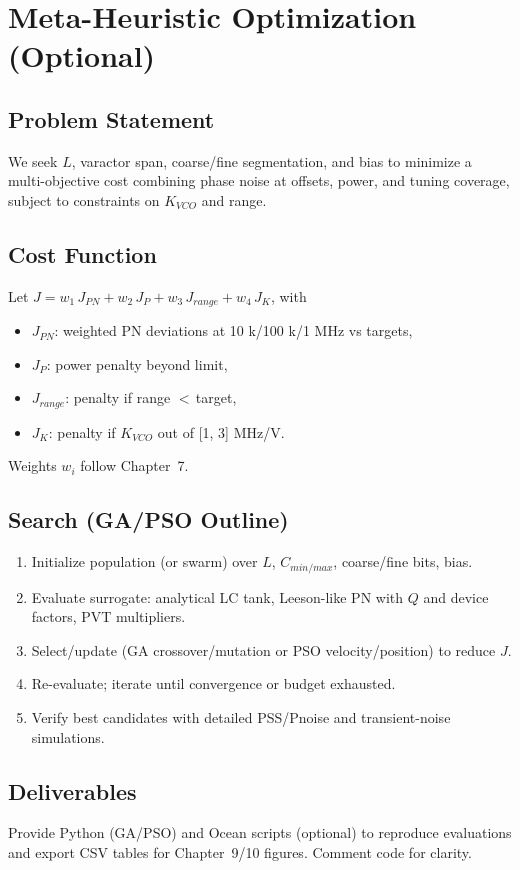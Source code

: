 \chapter{Meta-Heuristic Optimization (Optional)}
\section{Problem Statement}
We seek $L$, varactor span, coarse/fine segmentation, and bias to minimize a multi-objective cost combining phase noise at offsets, power, and tuning coverage, subject to constraints on $K_{VCO}$ and range.

\section{Cost Function}
Let $J = w_1\,J_{PN} + w_2\,J_{P} + w_3\,J_{range} + w_4\,J_{K}$, with
\begin{itemize}
  \item $J_{PN}$: weighted PN deviations at 10 k/100 k/1 MHz vs targets,
  \item $J_P$: power penalty beyond limit,
  \item $J_{range}$: penalty if range $<\,$target,
  \item $J_{K}$: penalty if $K_{VCO}$ out of [1, 3] MHz/V.
\end{itemize}
Weights $w_i$ follow Chapter~7.

\section{Search (GA/PSO Outline)}
\begin{enumerate}
  \item Initialize population (or swarm) over $L$, $C_{min/max}$, coarse/fine bits, bias.
  \item Evaluate surrogate: analytical LC tank, Leeson-like PN with $Q$ and device factors, PVT multipliers.
  \item Select/update (GA crossover/mutation or PSO velocity/position) to reduce $J$.
  \item Re-evaluate; iterate until convergence or budget exhausted.
  \item Verify best candidates with detailed PSS/Pnoise and transient-noise simulations.
\end{enumerate}

\section{Deliverables}
Provide Python (GA/PSO) and Ocean scripts (optional) to reproduce evaluations and export CSV tables for Chapter~9/10 figures. Comment code for clarity.

